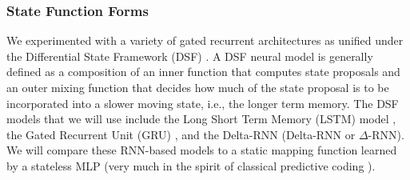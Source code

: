 \documentclass[smallabstract,smallcaptions]{dccpaper}
\begin{document}
\subsubsection{State Function Forms}
\label{state_fun}
We experimented with a variety of gated recurrent architectures as unified under the Differential State Framework (DSF) \cite{ororbia2017diff}. A DSF neural model is generally defined as a composition of an inner function that computes state proposals and an outer mixing function that decides how much of the state proposal is to be incorporated into a slower moving state, i.e., the longer term memory.
The DSF models that we will use include the Long Short Term Memory (LSTM) model \cite{hochreiter1997long}, the Gated Recurrent Unit (GRU) \cite{chung2014empirical}, and the Delta-RNN (Delta-RNN or $\Delta$-RNN). We will compare these RNN-based models to a static mapping function learned by a stateless MLP (very much in the spirit of classical predictive coding \cite{spratling2017pred}).
\end{document}
